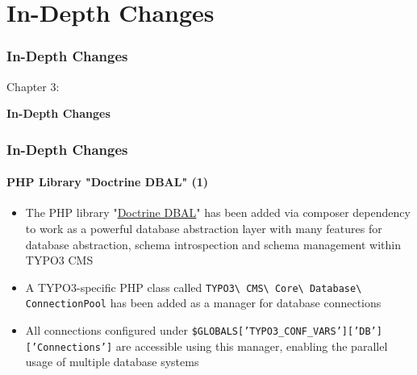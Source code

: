 %

\section{In-Depth Changes}
\begin{frame}[fragile]
	\frametitle{In-Depth Changes}

	\begin{center}\huge{Chapter 3:}\end{center}
	\begin{center}\huge{\color{typo3darkgrey}\textbf{In-Depth Changes}}\end{center}

\end{frame}


\begin{frame}[fragile]
	\frametitle{In-Depth Changes}
	\framesubtitle{PHP Library "Doctrine DBAL" (1)}

	\begin{itemize}

		\item The PHP library
			"\href{http://www.doctrine-project.org}{Doctrine DBAL}"
			has been added via composer dependency
			to work as a powerful database abstraction layer with many features for
			database abstraction, schema introspection and schema management within
			TYPO3 CMS

		\item A TYPO3-specific PHP class called
			\texttt{TYPO3\textbackslash
				CMS\textbackslash
				Core\textbackslash
				Database\textbackslash
				ConnectionPool}\newline
			has been added as a manager for database connections

		\item All connections configured under
			\texttt{\$GLOBALS['TYPO3\_CONF\_VARS']['DB']['Connections']}\newline
			are accessible using this manager, enabling the parallel usage of
			multiple database systems

	\end{itemize}

\end{frame}

